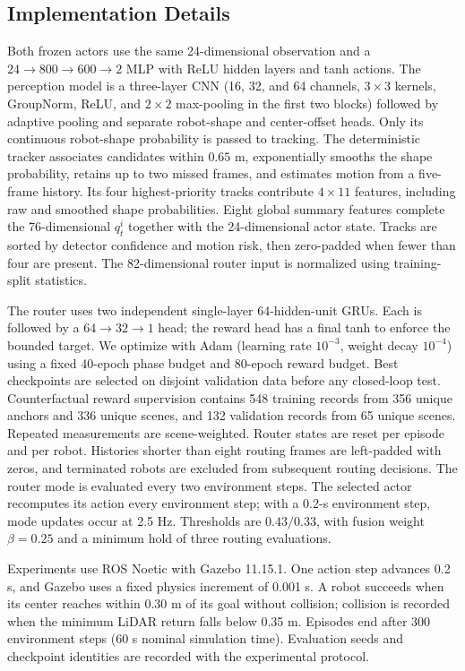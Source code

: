 \documentclass[letterpaper,10pt,conference]{ieeeconf}
\begin{document}
\subsection{Implementation Details}
Both frozen actors use the same 24-dimensional observation and a $24\!\to\!800\!\to\!600\!\to\!2$ MLP with ReLU hidden layers and tanh actions. The perception model is a three-layer CNN (16, 32, and 64 channels, $3\times3$ kernels, GroupNorm, ReLU, and $2\times2$ max-pooling in the first two blocks) followed by adaptive pooling and separate robot-shape and center-offset heads. Only its continuous robot-shape probability is passed to tracking. The deterministic tracker associates candidates within $0.65$ m, exponentially smooths the shape probability, retains up to two missed frames, and estimates motion from a five-frame history. Its four highest-priority tracks contribute $4\times11$ features, including raw and smoothed shape probabilities. Eight global summary features complete the 76-dimensional $q_t^i$ together with the 24-dimensional actor state. Tracks are sorted by detector confidence and motion risk, then zero-padded when fewer than four are present. The 82-dimensional router input is normalized using training-split statistics.

The router uses two independent single-layer 64-hidden-unit GRUs. Each is followed by a $64\!\to\!32\!\to\!1$ head; the reward head has a final tanh to enforce the bounded target. We optimize with Adam (learning rate $10^{-3}$, weight decay $10^{-4}$) using a fixed 40-epoch phase budget and 80-epoch reward budget. Best checkpoints are selected on disjoint validation data before any closed-loop test. Counterfactual reward supervision contains 548 training records from 356 unique anchors and 336 unique scenes, and 132 validation records from 65 unique scenes. Repeated measurements are scene-weighted. Router states are reset per episode and per robot. Histories shorter than eight routing frames are left-padded with zeros, and terminated robots are excluded from subsequent routing decisions. The router mode is evaluated every two environment steps. The selected actor recomputes its action every environment step; with a 0.2-s environment step, mode updates occur at 2.5 Hz. Thresholds are $0.43/0.33$, with fusion weight $\beta=0.25$ and a minimum hold of three routing evaluations.

Experiments use ROS Noetic with Gazebo 11.15.1. One action step advances 0.2 s, and Gazebo uses a fixed physics increment of 0.001 s. A robot succeeds when its center reaches within 0.30 m of its goal without collision; collision is recorded when the minimum LiDAR return falls below 0.35 m. Episodes end after 300 environment steps (60 s nominal simulation time). Evaluation seeds and checkpoint identities are recorded with the experimental protocol.
\end{document}
